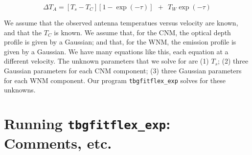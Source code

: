 \documentclass[preprint]{aastex}
\begin{document}
\begin{equation} \label{diff}
\Delta T_A = \left[T_s - T_C\right] \left[1 - \exp(-\tau)\right] \ \  + \ \ T_W \exp(-\tau)
\end{equation}

We assume that the observed antenna temperatues versus velocity are
known, and that the $T_C$ is known.  We assume that, for the CNM, the
optical depth profile is given by a Gaussian; and that, for the WNM, the
emission profile is given by a Gaussian. We have many equations like
this, each equation at a different velocity. The unknown parameters that
we solve for are (1) $T_s$; (2) three Gaussian parameters for each CNM
component; (3) three Gaussian parameters for each WNM component.  Our
program {\tt tbgfitflex\_exp} solves for these unknowns.

\section{Running {\tt tbgfitflex\_exp}: Comments, etc.}
\end{document}
